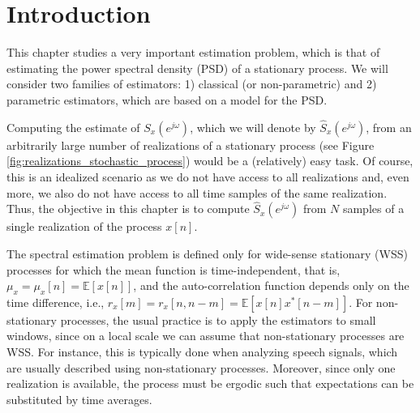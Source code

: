 \section{Introduction}

This chapter studies a very important estimation problem, which is that of estimating the power spectral density (PSD) of a stationary process. We will consider two families of estimators: 1) classical (or non-parametric) and 2) parametric estimators, which are based on a model for the PSD.

Computing the estimate of $S_x(e^{j \omega})$, which we will denote by $\hat{S}_x(e^{j \omega})$, from an arbitrarily large number of realizations of a stationary process (see Figure \ref{fig:realizations_stochastic_process}) would be a (relatively) easy task. Of course, this is an idealized scenario as we do not have access to all realizations and, even more, we also do not have access to all time samples of the same realization. Thus, the objective in this chapter is to compute $\hat{S}_x(e^{j \omega})$ from $N$ samples of a single realization of the process $x[n]$.

The spectral estimation problem is defined only for wide-sense stationary (WSS) processes for which the mean function is time-independent, that is, $\mu_x = \mu_x[n] = \mathbb{E}[x[n]]$, and the auto-correlation function depends only on the time difference, i.e., $r_{x}[m] = r_{x}[n,n-m] = \mathbb{E}[x[n] x^{\ast}[n-m]]$. For non-stationary processes, the usual practice is to apply the estimators to small windows, since on a local scale we can assume that non-stationary processes are WSS. For instance, this is typically done when analyzing speech signals, which are usually described using non-stationary processes. Moreover, since only one realization is available, the process must be ergodic such that expectations can be substituted by time averages.

